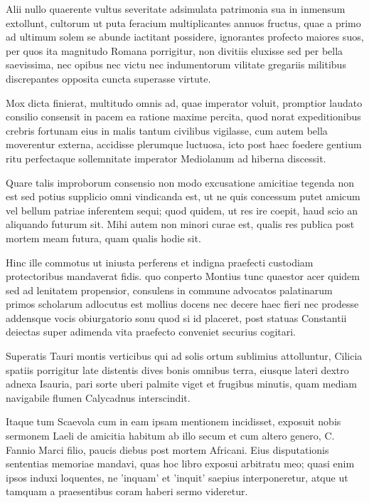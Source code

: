 \documentclass[12pt]{book}
\begin{document}
Alii nullo quaerente vultus severitate adsimulata patrimonia sua in inmensum extollunt, cultorum ut puta feracium multiplicantes annuos fructus, quae a primo ad ultimum solem se abunde iactitant possidere, ignorantes profecto maiores suos, per quos ita magnitudo Romana porrigitur, non divitiis eluxisse sed per bella saevissima, nec opibus nec victu nec indumentorum vilitate gregariis militibus discrepantes opposita cuncta superasse virtute.

Mox dicta finierat, multitudo omnis ad, quae imperator voluit, promptior laudato consilio consensit in pacem ea ratione maxime percita, quod norat expeditionibus crebris fortunam eius in malis tantum civilibus vigilasse, cum autem bella moverentur externa, accidisse plerumque luctuosa, icto post haec foedere gentium ritu perfectaque sollemnitate imperator Mediolanum ad hiberna discessit.

Quare talis improborum consensio non modo excusatione amicitiae tegenda non est sed potius supplicio omni vindicanda est, ut ne quis concessum putet amicum vel bellum patriae inferentem sequi; quod quidem, ut res ire coepit, haud scio an aliquando futurum sit. Mihi autem non minori curae est, qualis res publica post mortem meam futura, quam qualis hodie sit.

Hinc ille commotus ut iniusta perferens et indigna praefecti custodiam protectoribus mandaverat fidis. quo conperto Montius tunc quaestor acer quidem sed ad lenitatem propensior, consulens in commune advocatos palatinarum primos scholarum adlocutus est mollius docens nec decere haec fieri nec prodesse addensque vocis obiurgatorio sonu quod si id placeret, post statuas Constantii deiectas super adimenda vita praefecto conveniet securius cogitari.

Superatis Tauri montis verticibus qui ad solis ortum sublimius attolluntur, Cilicia spatiis porrigitur late distentis dives bonis omnibus terra, eiusque lateri dextro adnexa Isauria, pari sorte uberi palmite viget et frugibus minutis, quam mediam navigabile flumen Calycadnus interscindit.

Itaque tum Scaevola cum in eam ipsam mentionem incidisset, exposuit nobis sermonem Laeli de amicitia habitum ab illo secum et cum altero genero, C. Fannio Marci filio, paucis diebus post mortem Africani. Eius disputationis sententias memoriae mandavi, quas hoc libro exposui arbitratu meo; quasi enim ipsos induxi loquentes, ne 'inquam' et 'inquit' saepius interponeretur, atque ut tamquam a praesentibus coram haberi sermo videretur.
\end{document}
